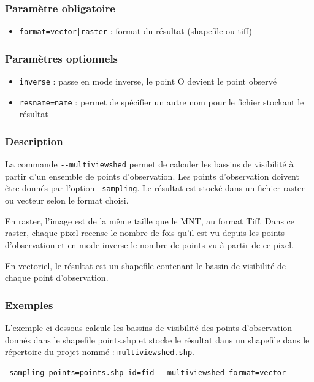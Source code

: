 \documentclass{report}
\begin{document}
\subsubsection{Paramètre obligatoire}
\begin{itemize}
	\item \verb/format=vector|raster/ : format du résultat (shapefile ou tiff)
\end{itemize}

\subsubsection{Paramètres optionnels}
\begin{itemize}
	\item \verb|inverse| : passe en mode inverse, le point O devient le point observé
	\item \verb|resname=name| : permet de spécifier un autre nom pour le fichier stockant le résultat
\end{itemize}

\subsubsection{Description}
La commande \verb|--multiviewshed| permet de calculer les bassins de visibilité à partir d'un ensemble de points d'observation. Les points d'observation doivent être donnés par l'option \verb|-sampling|. Le résultat est stocké dans un fichier raster ou vecteur selon le format choisi. 

En raster, l'image est de la même taille que le MNT, au format Tiff. Dans ce raster, chaque pixel recense le nombre de fois qu'il est vu depuis les points d'observation et en mode inverse le nombre de points vu à partir de ce pixel.

En vectoriel, le résultat est un shapefile contenant le bassin de visibilité de chaque point d'observation.

\subsubsection{Exemples}
L'exemple ci-dessous calcule les bassins de visibilité des points d'observation donnés dans le shapefile points.shp et stocke le résultat dans un shapefile dans le répertoire du projet nommé : \verb|multiviewshed.shp|.
\begin{Verbatim}
-sampling points=points.shp id=fid --multiviewshed format=vector
\end{Verbatim}
\end{document}
